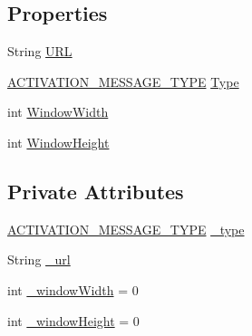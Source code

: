 \subsection*{Properties}
\begin{DoxyCompactItemize}
\item 
String \hyperlink{class_web_analyzer_1_1_models_1_1_message_model_1_1_activation_message_a4df0cf1fbf60a7211a5ee55831adcb9e}{U\+R\+L}
\item 
\hyperlink{class_web_analyzer_1_1_models_1_1_message_model_1_1_activation_message_ad3b5847039dd26527a842c6f7675b1b2}{A\+C\+T\+I\+V\+A\+T\+I\+O\+N\+\_\+\+M\+E\+S\+S\+A\+G\+E\+\_\+\+T\+Y\+P\+E} \hyperlink{class_web_analyzer_1_1_models_1_1_message_model_1_1_activation_message_a0f68201fb8faad6d3a2a074bc7670313}{Type}
\item 
int \hyperlink{class_web_analyzer_1_1_models_1_1_message_model_1_1_activation_message_adb9b326b9f17dd3dbe0ef8a645b7b38b}{Window\+Width}
\item 
int \hyperlink{class_web_analyzer_1_1_models_1_1_message_model_1_1_activation_message_aa7179d1f480e697fdd30d43b6919c076}{Window\+Height}
\end{DoxyCompactItemize}
\subsection*{Private Attributes}
\begin{DoxyCompactItemize}
\item 
\hyperlink{class_web_analyzer_1_1_models_1_1_message_model_1_1_activation_message_ad3b5847039dd26527a842c6f7675b1b2}{A\+C\+T\+I\+V\+A\+T\+I\+O\+N\+\_\+\+M\+E\+S\+S\+A\+G\+E\+\_\+\+T\+Y\+P\+E} \hyperlink{class_web_analyzer_1_1_models_1_1_message_model_1_1_activation_message_a108e256eff9daab288b9c8c8f18d9792}{\+\_\+type}
\item 
String \hyperlink{class_web_analyzer_1_1_models_1_1_message_model_1_1_activation_message_a7d5933c3187edc115317483ad31df6b4}{\+\_\+url}
\item 
int \hyperlink{class_web_analyzer_1_1_models_1_1_message_model_1_1_activation_message_a57c56a4024223834bf60bc90bce66327}{\+\_\+window\+Width} = 0
\item 
int \hyperlink{class_web_analyzer_1_1_models_1_1_message_model_1_1_activation_message_a2c2e9dc30927ed3ee522d3a18dd4832d}{\+\_\+window\+Height} = 0
\end{DoxyCompactItemize}

